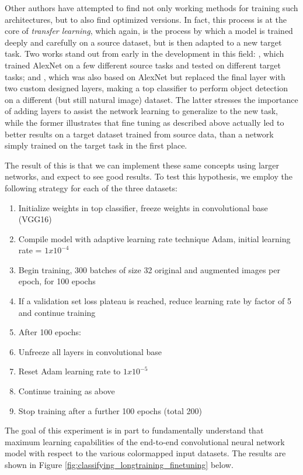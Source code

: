 Other authors have attempted to find not only working methods for training such architectures, but to also find optimized versions.
In fact, this process is at the core of \textit{transfer learning}, which again, is the process by which a model is trained deeply and carefully on a source dataset, but is then adapted to a new target task.
Two works stand out from early in the development in this field: \cite{yosinski2014transferable}, which trained AlexNet \cite{krizhevsky2012imagenet} on a few different source tasks and tested on different target tasks; and \cite{oquab2014learning}, which was also based on AlexNet but replaced the final layer with two custom designed layers, making a top classifier to perform object detection on a different (but still natural image) dataset.
The latter stresses the importance of adding layers to assist the network learning to generalize to the new task, while the former illustrates that fine tuning as described above actually led to better results on a target dataset trained from source data, than a network simply trained on the target task in the first place.

The result of this is that we can implement these same concepts using larger networks, and expect to see good results.
To test this hypothesis, we employ the following strategy for each of the three datasets:

\begin{enumerate}
	\item Initialize weights in top classifier, freeze weights in convolutional base (VGG16)
	\item Compile model with adaptive learning rate technique Adam, initial learning rate = $1 x 10^{-4}$
	\item Begin training, 300 batches of size 32 original and augmented images per epoch, for 100 epochs
		\item If a validation set loss plateau is reached, reduce learning rate by factor of 5 and continue training
	\item After 100 epochs: 
		\item Unfreeze all layers in convolutional base
		\item Reset Adam learning rate to $1 x 10^{-5}$ 
		\item Continue training as above
	\item Stop training after a further 100 epochs (total 200)
\end{enumerate}

The goal of this experiment is in part to fundamentally understand that maximum learning capabilities of the end-to-end convolutional neural network model with respect to the various colormapped input datasets.
The results are shown in Figure \ref{fig:classifying_longtraining_finetuning} below.

